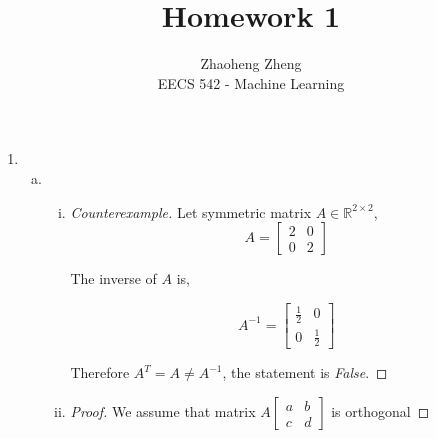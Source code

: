 \documentclass[12pt]{article}
\begin{document}
 
 
 
\title{Homework 1}%
\author{Zhaoheng Zheng\\ %
EECS 542 - Machine Learning} %
 
\maketitle

\begin{enumerate}[1)]
	\item 
   	\begin {enumerate}[(a)]
    	\item
        \begin{enumerate}[(i)]
       	\item
            \begin{proof}[Counterexample] 
                Let symmetric matrix $A \in \mathbb{R}^{2 \times 2}$, 
                  $$A = \left[
                      \begin{matrix}
                          2 & 0 \\
                          0 & 2
                      \end{matrix}
                  \right]$$

              The inverse of $A$ is,

                  $$A^{-1} = \left[
                      \begin{matrix}
                          \frac{1}{2} & 0 \\
                          0 & \frac{1}{2}
                      \end{matrix}
                  \right]$$

              Therefore $A^{T} = A \neq A^{-1}$, the statement is \emph{False}.  
          \end{proof}
		\item
            \begin{proof}
                We assume that matrix $A \left[
                        \begin{matrix}
                            a & b \\
                            c & d
                        \end{matrix}
                    \right]$ is orthogonal


\end{proof}
\end{enumerate}
\end{enumerate}
\end{enumerate}
\end{document}
